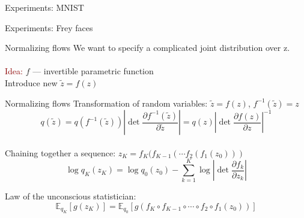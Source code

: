 \documentclass[unicode,11pt]{beamer}
\begin{document}
\begin{frame}{Experiments: MNIST}
\end{frame}


\begin{frame}{Experiments: Frey faces}
\end{frame}


\begin{frame}
  \centering\fontsize{24pt}{1em}\color{darkred}{\selectfont{What is wrong with VAE?}}
\end{frame}


\begin{frame}[fragile]{Normalizing flows}
  We want to specify a complicated joint distribution over z.\\
  ~\\
  \textcolor{darkred}{Idea:} $f$ --- invertible parametric function\\
  Introduce new $\tilde{z} = f(z)$

\end{frame}


\begin{frame}[fragile]{Normalizing flows}
  Transformation of random variables: $\tilde{z} = f(z)$, $f^{-1}(\tilde{z}) = z$\\
  $$
  q(\tilde{z})
  = q(f^{-1}(\tilde{z})) \left\vert \det \frac{\partial f^{-1}(\tilde{z})}{\partial \tilde{z}} \right\vert
  = q(z) \left\vert \det \frac{\partial f(z)}{\partial z} \right\vert^{-1}
  $$ \\
  Chaining together a sequence: $z_K = f_K ( f_{K−1} ( \cdots f_2 ( f_1(z_0)))$\\
  $$\log q_K(z_K) = \log q_0(z_0) − \sum_{k=1}^K \log \left\vert \det \frac{\partial f_k}{\partial z_k} \right\vert $$

  Law of the unconscious statistician:\\
  $$\mathbb{E}_{q_K} \left[g(z_K)\right] = \mathbb{E}_{q_0} \left[ g(f_K \circ f_{K−1} \circ \cdots \circ f_2
  \circ f_1(z_0)) \right] $$
\end{frame}
\end{document}

